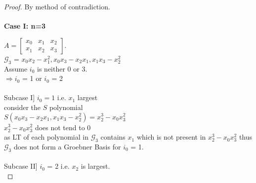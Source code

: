 \documentclass[12pt,a4paper]{article}
\theoremstyle{definition}
\begin{document}
\begin{proof}
\noindent By method of contradiction.\\
\\
{\bf Case I: n=3}

$A = \left[\begin{matrix}
x_{0} & x_{1} & x_{2} \\
x_{1} & x_{2} & x_{3}\end{matrix}\right]$.\\
$\mathcal{G}_3$ = {$ x_{0}x_{2} - x_{1}^2, x_{0}x_{3} - x_{2}x_{1} , x_{1}x_{3} - x_{2}^2$} \\
Assume $i_{0}$  is  neither  0  or  3.\\
$\Rightarrow i_{0}$ = 1 or $i_{0}$ = 2 \\
\\
Subcase I] $i_{0} = 1$ i.e. $x_{1}$ largest\\
consider the $S$ polynomial \\
$S(x_{0}x_{3} - x_{2}x_{1} , x_{1}x_{3} - x_{2}^2) = x_{2}
^3 - x_{0}x_{3}^2 $ \\
$x_{2}^3 - x_{0}x_{3}^2$ does not tend to 0  \\
as LT of each polynomial in $\mathcal{G}_3$ contains $x_{1}$
which is not present in $x_{2}^3 - x_{0}x_{3}^2$ thus $\mathcal{G}_3$ does not form a Groebner Basis for $i_{0}$ = 1.\\
\\
Subcase II] $i_{0}$ = 2 i.e. $x_{2}$ is largest.\\


\end{proof}
\end{document}
